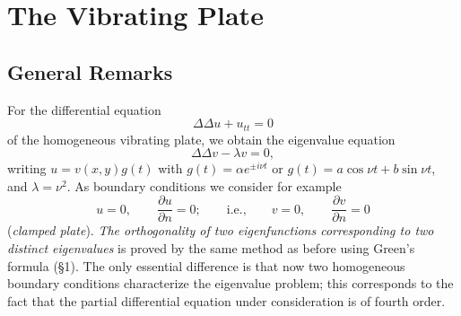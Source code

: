 \section{The Vibrating Plate}
\subsection{General Remarks}
For the differential equation
\[
\Delta\Delta u+u_{tt}=0
\]
of the homogeneous vibrating plate, we obtain the eigenvalue equation
\begin{equation}\tag{32}
\Delta\Delta v-\lambda v=0,
\end{equation}
writing $u=v(x,y)g(t)$ with $g(t)=\alpha e^{\pm i\nu t}$ or $g(t)=a\cos\nu t+b\sin\nu t$, and $\lambda=\nu^2$. As boundary conditions we consider for example
\[
u=0,\qquad \frac{\partial u}{\partial n}=0;
\qquad\text{i.e.,}\qquad
v=0,\qquad \frac{\partial v}{\partial n}=0
\]
(\emph{clamped plate}). \emph{The orthogonality of two eigenfunctions corresponding to two distinct eigenvalues} is proved by the same method as before using Green's formula (\S1). The only essential difference is that now two homogeneous boundary conditions characterize the eigenvalue problem; this corresponds to the fact that the partial differential equation under consideration is of fourth order.

